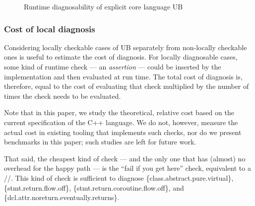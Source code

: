 \vspace{5mm} %
\begin{figure}[t!]
    \centering
    \caption{Runtime diagnosability of explicit core language UB}
    \label{piechart_locally}
\end{figure}

\subsubsection{Cost of local diagnosis}
\label{cost_local}

Considering locally checkable cases of UB separately from non-locally checkable ones is useful to estimate the cost of diagnosis. For locally diagnosable cases, some kind of runtime check --- an \emph{assertion} --- could be inserted by the implementation and then evaluated at run time. The total cost of diagnosis is, therefore, equal to the cost of evaluating that check multiplied by the number of times the check needs to be evaluated.

Note that in this paper, we study the theoretical, relative cost based on the current specification of the C++ language. We do not, however, measure the actual cost in existing tooling that implements such checks, nor do we present benchmarks in this paper; such studies are left for future work.

That said, the cheapest kind of check --- and the only one that has (almost) no overhead for the happy path --- is the ``fail if you get here'' check, equivalent to a //. This kind of check is sufficient to diagnose \{class.abstract.pure.virtual\}, \{stmt.return.flow.off\}, \{stmt.return.coroutine.flow.off\}, and \{dcl.attr.noreturn.eventually.returns\}.

